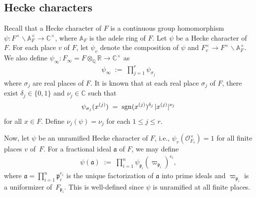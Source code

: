 \documentclass[11pt]{amsart}
\theoremstyle{remark}
\newcommand\fr[1]{\mathfrak{#1}}
\newcommand{\rat}{\mathbb{Q}}
\newcommand{\real}{\mathbb{R}}
\newcommand{\comp}{\mathbb{C}}
\newcommand{\ade}{\mathbb{A}}
\newcommand{\clo}{\mathcal{O}}
\newcommand{\bslash}{\backslash}
\newcommand{\eq}{\;=\;}
\newcommand{\deq}{\;:=\;}
\def\thin{{\hskip 1pt}}
\newcommand{\sgn}{\mathrm{sgn}}
\begin{document}
\subsection{Hecke characters}
\label{hecke-char-sect}

Recall that a Hecke character of $F$ is a continuous group homomorphism $\psi:F^\times\bslash\ade_F^\times\rightarrow\comp^\times$, where $\ade_F$ is the adele ring of $F$. Let $\psi$ be a Hecke character of $F$. For each place $v$ of $F$, let $\psi_v$ denote the composition of $\psi$ and $F_v^\times\rightarrow F^\times\bslash\ade_F^\times$. We also define  $\psi_\infty:F_\infty=F\otimes_\rat\real\rightarrow\comp^\times$ as
\begin{align*}
    \psi_\infty\deq\prod_{j=1}^r\psi_{\sigma_j}
\end{align*}
where $\sigma_j$ are real places of $F$. It is known that at each real place $\sigma_j$ of $F$, there exist $\delta_j\in\{0,1\}$ and $\nu_j\in\comp$ such that
\begin{align*}
    \psi_{\sigma_j}(x^{(j)})\eq\sgn(x^{(j)})^{\delta_j}\thin|x^{(j)}|^{\nu_j}
\end{align*}
for all $x\in F$. Define $\nu_j(\psi)=\nu_j$ for each $1\leq j\leq r$.

Now, let $\psi$ be an unramified Hecke character of $F$, i.e., $\psi_v(\clo_{F_v}^\times)=1$ for all finite places $v$ of~$F$. For a fractional ideal $\fr{a}$ of $F$, we may define
\begin{align*}
    \psi(\fr{a})\deq\prod_{i=1}^n\psi_{\fr{p}_i}(\varpi_{\fr{p}_i})^{e_i},
\end{align*}
where $\fr{a}=\prod_{i=1}^n\fr{p}_i^{e_i}$ is the unique factorization of $\fr{a}$ into prime ideals and $\varpi_{\fr{p}_i}$ is a uniformizer of~$F_{\fr{p}_i}$. This is well-defined since $\psi$ is unramified at all finite places.
\end{document}
